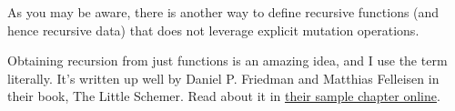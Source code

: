 
As you may be aware, there is another way to define recursive functions (and
hence recursive data) that does not leverage explicit mutation operations.


Obtaining recursion from just functions is an amazing idea, and I use the term
literally. It’s written up well by Daniel P. Friedman and Matthias Felleisen in
their book, The Little Schemer. Read about it in
\href{http://www.ccs.neu.edu/home/matthias/BTLS/sample.pdf}{their sample chapter online}.

